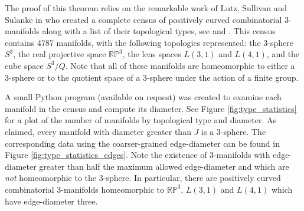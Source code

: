 \documentclass[12pt]{article}
\begin{document}
\noindent The proof of this theorem relies on the remarkable work of Lutz, Sullivan and Sulanke in \cite{Lutz07, LutzSul_unpub, sulanke2009isomorphism} who created a complete census of positively curved combinatorial 3-manifolds along with a list of their topological types, see \cite{Lutz_online_manifolds} and \cite{Lutz_online_topological_types}. This census contains 4787 manifolds, with the following topologies represented: the 3-sphere $S^3$, the real projective space $\mathbb{RP}^3$, the lens spaces $L(3,1)$ and $L(4,1)$, and the cube space $S^3/Q$. Note that all of these manifolds are homeomorphic to either a 3-sphere or to the quotient space of a 3-sphere under the action of a finite group. 

A small Python program (available on request) was created to examine each manifold in the census and compute its diameter. See Figure \ref{fig:type_statistics} for a plot of the number of manifolds by topological type and diameter. As claimed, every manifold with diameter greater than $J$ is a 3-sphere. The corresponding data using the coarser-grained edge-diameter can be found in Figure \ref{fig:type_statistics_edges}. Note the existence of $3$-manifolds with edge-diameter greater than half the maximum allowed edge-diameter and which are {\em not} homeomorphic to the 3-sphere. In particular, there are positively curved combinatorial 3-manifolds homeomorphic to $\mathbb{RP}^3$, $L(3,1)$ and $L(4,1)$ which have edge-diameter three.
\end{document}
